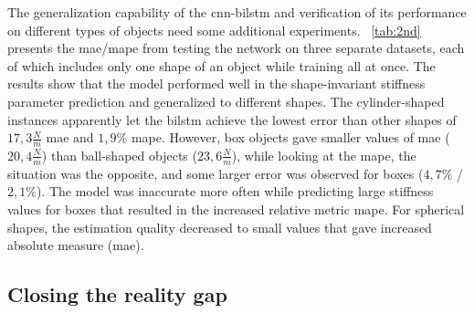 \documentclass[a4paper, 10pt, twoside]{report}
\begin{document}
The generalization capability of the \acrshort{cnn}-\acrshort{bilstm} and verification of its performance on different types of objects need some additional experiments. \Table~\ref{tab:2nd} presents the \acrshort{mae}/\acrshort{mape} from testing the network on three separate datasets, each of which includes only one shape of an object while training all at once. The results show that the model performed well in the shape-invariant stiffness parameter prediction and generalized to different shapes. The cylinder-shaped instances apparently let the \acrshort{bilstm} achieve the lowest error than other shapes of $17,3\frac{N}{m}$ \acrshort{mae} and $1,9\%$ \acrshort{mape}. However, box objects gave smaller values of \acrshort{mae} ($20,4\frac{N}{m}$) than ball-shaped objects ($23,6\frac{N}{m}$), while looking at the \acrshort{mape}, the situation was the opposite, and some larger error was observed for boxes ($4,7\%$ / $2,1\%$). The model was inaccurate more often while predicting large stiffness values for boxes that resulted in the increased relative metric \acrshort{mape}. For spherical shapes, the estimation quality decreased to small values that gave increased absolute measure (\acrshort{mae}). 

\subsection{Closing the reality gap}
\label{part:experiments:materials:stiffness:estimation:gap}
\end{document}
